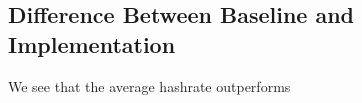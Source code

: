 \documentclass[10pt, conference, compsocconf]{IEEEtran}
\begin{document}
\subsection{Difference Between Baseline and Implementation}
We see that the average hashrate outperforms 

\end{document}
